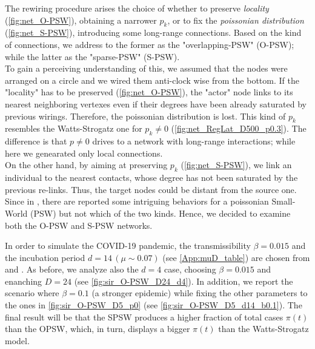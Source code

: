 \documentclass[a4paper,10pt,twoside]{book} %
\theoremstyle{definition}
\begin{document}
The rewiring procedure arises the choice of whether to preserve \textit{locality}  (\autoref{fig:net_O-PSW}), obtaining a narrower $p_k$, or to fix the \textit{poissonian distribution} (\autoref{fig:net_S-PSW}), introducing some long-range connections. Based on the kind of connections, we address to the former as the "overlapping-PSW" (O-PSW); while the latter as the "sparse-PSW" (S-PSW). \\
To gain a perceiving understanding of this, we assumed that the nodes were arranged on a circle and we wired them anti-clock wise from the bottom. If the "locality" has to be preserved (\autoref{fig:net_O-PSW}), the "actor" node links to its nearest neighboring vertexes even if their degrees have been already saturated by previous wirings. Therefore, the poissonian distribution is lost. This kind of $ p_k$ resembles the Watts-Strogatz one for $ p_k \neq 0$ (\autoref{fig:net_RegLat_D500_p0.3}). The difference is that $ p \neq 0$ drives to a network with long-range interactions; while here we genearated only local connections.\\
On the other hand, by aiming at preserving $p_k$ (\autoref{fig:net_S-PSW}), we link an individual to the nearest contacts, whose degree has not been saturated by the previous re-links. Thus, the target nodes could be distant from the source one. Since in \cite{Thurner::Appendix_NetBasedExpl}, there are reported some intriguing behaviors for a poissonian Small-World (PSW) but not which of the two kinds. Hence, we decided to examine both the O-PSW and S-PSW networks.

In order to simulate the COVID-19 pandemic, the transmissibility $\beta = 0.015$ and the incubation period $d = 14 \, ( \mu \sim 0.07)$ (see \autoref{App:muD_table}) are chosen from \cite{Thurner::NetBasedExpl} and \cite{LaurerSA:2020_IncPeriodCOVID-19}. As before, we analyze also the $d = 4$ case, choosing $\beta = 0.015$ and enanching $ D = 24$ (see \autoref{fig:sir_O-PSW_D24_d4}). In addition, we report the scenario where $ \beta = 0.1$ (a stronger epidemic) while fixing the other parameters to the ones in \autoref{fig:sir_O-PSW_D5_p0} (see \autoref{fig:sir_O-PSW_D5_d14_b0.1}).
The final result will be that the SPSW produces a higher fraction of total cases $\pi(t)$ than the OPSW, which, in turn, displays a bigger $\pi(t)$ than the Watts-Strogatz model. 
\end{document}

